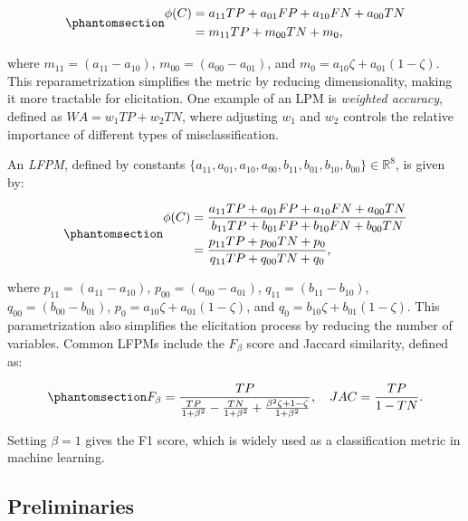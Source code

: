 \documentclass[
  letterpaper,
  numbers=noenddot,
  DIV=11]{scrreprt}
\theoremstyle{definition}
\theoremstyle{plain}
\theoremstyle{plain}
\theoremstyle{remark}
\begin{document}
\begin{equation}\phantomsection\label{eq-eqlpm}{\begin{aligned}
\phi(C) &= a_{11} TP + a_{01} FP + a_{10} FN + a_{00} TN\\
&= m_{11} TP + m_{00} TN + m_{0},
\end{aligned}}\end{equation}

where \(m_{11} = (a_{11} - a_{10})\), \(m_{00} = (a_{00} - a_{01})\),
and \(m_{0} = a_{10} \zeta + a_{01} (1 - \zeta)\). This
reparametrization simplifies the metric by reducing dimensionality,
making it more tractable for elicitation. One example of an LPM is
\emph{weighted accuracy}, defined as \(WA = w_1TP + w_2TN\), where
adjusting \(w_1\) and \(w_2\) controls the relative importance of
different types of misclassification.

An \emph{LFPM}, defined by constants
\(\{a_{11}, a_{01}, a_{10}, a_{00}, b_{11}, b_{01}, b_{10}, b_{00}\} \in \mathbb{R}^{8}\),
is given by:

\begin{equation}\phantomsection\label{eq-eqlfpm}{\begin{aligned}
\phi(C) &= \frac{a_{11} TP + a_{01} FP + a_{10} FN + a_{00} TN}{b_{11} TP + b_{01} FP + b_{10} FN + b_{00} TN}\\
&= \frac{p_{11} TP + p_{00} TN + p_{0}}{q_{11} TP + q_{00} TN + q_{0}},
\end{aligned}}\end{equation}

where \(p_{11} = (a_{11} - a_{10})\), \(p_{00} = (a_{00} - a_{01})\),
\(q_{11} = (b_{11} - b_{10})\), \(q_{00} = (b_{00} - b_{01})\),
\(p_{0} = a_{10} \zeta + a_{01} (1 - \zeta)\), and
\(q_{0} = b_{10} \zeta + b_{01} (1 - \zeta)\). This parametrization also
simplifies the elicitation process by reducing the number of variables.
Common LFPMs include the \(F_\beta\) score and Jaccard similarity,
defined as:

\begin{equation}\phantomsection\label{eq-lfpm_metrics}{F_{\beta} = \frac{TP}{\frac{TP}{1+\beta^{2}} - \frac{TN}{1+\beta^{2}} + \frac{\beta^{2} \zeta + 1 - \zeta}{1+\beta^{2}}}, \quad JAC = \frac{TP}{1 - TN}.}\end{equation}

Setting \(\beta = 1\) gives the F1 score, which is widely used as a
classification metric in machine learning.

\subsection{Preliminaries}\label{sec-me-preliminaries}
\end{document}
